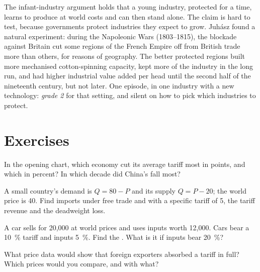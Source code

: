\begin{record}
The infant-industry argument holds that a young industry, protected for a time,
learns to produce at world costs and can then stand alone. The claim is hard to
test, because governments protect industries they expect to grow. Juhász found a
natural experiment: during the Napoleonic Wars (1803--1815), the blockade against
Britain cut some regions of the French Empire off from British trade more than
others, for reasons of geography. The better protected regions built more
mechanised cotton-spinning capacity, kept more of the industry in the long run,
and had higher industrial value added per head until the second half of the
nineteenth century, but not later. %
One episode, in one industry with a new technology: \emph{grade 2} for that
setting, and silent on how to pick which industries to protect.
\end{record}

\section{Exercises}\label{sec:b3:trade-policy:exercises}

\begin{exercise}[$\star$]\label{exo:b3:trade-policy:1}
In the opening chart, which economy cut its average tariff most in points, and
which in percent? In which decade did China's fall most?
\end{exercise}

\begin{exercise}[$\star$]\label{exo:b3:trade-policy:2}
A small country's demand is $Q = 80 - P$ and its supply $Q = P - 20$; the world price
is 40. Find imports under free trade and with a specific tariff of 5, the tariff
revenue and the deadweight loss.
\end{exercise}

\begin{exercise}[$\star$]\label{exo:b3:trade-policy:3}
A car sells for 20{,}000 at world prices and uses inputs worth 12{,}000. Cars bear a
10~\% tariff and inputs 5~\%. Find the . What is it if
inputs bear 20~\%?
\end{exercise}

\begin{exercise}[$\star$]\label{exo:b3:trade-policy:4}
What price data would show that foreign exporters absorbed a tariff in full? Which
prices would you compare, and with what?
\end{exercise}

